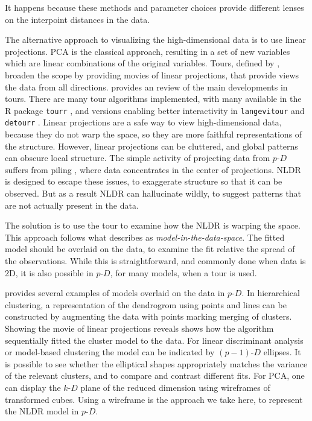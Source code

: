 \documentclass[
  12pt]{article}
\newcommand\pD{$p\text{-}D$}
\newcommand\kD{$k\text{-}D$}
\begin{document}
It happens because these methods and parameter choices provide different
lenses on the interpoint distances in the data.

The alternative approach to visualizing the high-dimensional data is to
use linear projections. PCA is the classical approach, resulting in a
set of new variables which are linear combinations of the original
variables. Tours, defined by \citet{lee2021}, broaden the scope by
providing movies of linear projections, that provide views the data from
all directions. \citet{lee2021} provides an review of the main
developments in tours. There are many tour algorithms implemented, with
many available in the R package \texttt{tourr} \citep{wickham2011}, and
versions enabling better interactivity in \texttt{langevitour}
\citep{harisson2024} and \texttt{detourr} \citep{hart2022}. Linear
projections are a safe way to view high-dimensional data, because they
do not warp the space, so they are more faithful representations of the
structure. However, linear projections can be cluttered, and global
patterns can obscure local structure. The simple activity of projecting
data from \pD{} suffers from piling \citep{laa2022}, where data
concentrates in the center of projections. NLDR is designed to escape
these issues, to exaggerate structure so that it can be observed. But as
a result NLDR can hallucinate wildly, to suggest patterns that are not
actually present in the data.

The solution is to use the tour to examine how the NLDR is warping the
space. This approach follows what \citet{wickham2015} describes as
\emph{model-in-the-data-space}. The fitted model should be overlaid on
the data, to examine the fit relative the spread of the observations.
While this is straightforward, and commonly done when data is 2D, it is
also possible in \pD{}, for many models, when a tour is used.

\citet{wickham2015} provides several examples of models overlaid on the
data in \pD{}. In hierarchical clustering, a representation of the
dendrogrom using points and lines can be constructed by augmenting the
data with points marking merging of clusters. Showing the movie of
linear projections reveals shows how the algorithm sequentially fitted
the cluster model to the data. For linear discriminant analysis or
model-based clustering the model can be indicated by \((p-1)\text{-}D\)
ellipses. It is possible to see whether the elliptical shapes
appropriately matches the variance of the relevant clusters, and to
compare and contrast different fits. For PCA, one can display the \kD{}
plane of the reduced dimension using wireframes of transformed cubes.
Using a wireframe is the approach we take here, to represent the NLDR
model in \pD{}.
\end{document}
